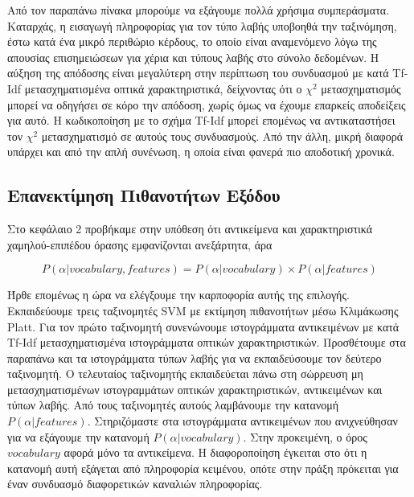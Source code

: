 \documentclass[11pt,a4paper,english,greek,twoside]{../Thesis}
\begin{document}
\par Από τον παραπάνω πίνακα μπορούμε να εξάγουμε πολλά χρήσιμα συμπεράσματα. Καταρχάς, η εισαγωγή πληροφορίας για τον τύπο λαβής υποβοηθά την ταξινόμηση, έστω κατά ένα μικρό περιθώριο κέρδους, το οποίο είναι αναμενόμενο λόγω της απουσίας επισημειώσεων για χέρια και τύπους λαβής στο σύνολο δεδομένων. Η αύξηση της απόδοσης είναι μεγαλύτερη στην περίπτωση του συνδυασμού με κατά Tf-Idf μετασχηματισμένα οπτικά χαρακτηριστικά, δείχνοντας ότι ο $\chi^2$ μετασχηματισμός μπορεί να οδηγήσει σε κόρο την απόδοση, χωρίς όμως να έχουμε επαρκείς αποδείξεις για αυτό. Η κωδικοποίηση με το σχήμα Tf-Idf μπορεί επομένως να αντικαταστήσει τον $\chi^2$ μετασχηματισμό σε αυτούς τους συνδυασμούς. Από την άλλη, μικρή διαφορά υπάρχει και από την απλή συνένωση, η οποία είναι φανερά πιο αποδοτική χρονικά.


\subsection{Επανεκτίμηση Πιθανοτήτων Εξόδου}
Στο κεφάλαιο 2 προβήκαμε στην υπόθεση ότι αντικείμενα και χαρακτηριστικά χαμηλού-επιπέδου όρασης εμφανίζονται ανεξάρτητα, άρα

\begin{equation}\label{eq:c6Probs}
    P(\alpha | vocabulary, features)=P(\alpha|vocabulary) \times P(\alpha|features)
\end{equation}

Ήρθε επομένως η ώρα να ελέγξουμε την καρποφορία αυτής της επιλογής. Εκπαιδεύουμε τρεις ταξινομητές SVM με εκτίμηση πιθανοτήτων μέσω Κλιμάκωσης Platt. Για τον πρώτο ταξινομητή συνενώνουμε ιστογράμματα αντικειμένων με κατά Tf-Idf μετασχηματισμένα ιστογράμματα οπτικών χαρακτηριστικών. Προσθέτουμε στα παραπάνω και τα ιστογράμματα τύπων λαβής για να εκπαιδεύσουμε τον δεύτερο ταξινομητή. Ο τελευταίος ταξινομητής εκπαιδεύεται πάνω στη σώρρευση μη μετασχηματισμένων ιστογραμμάτων οπτικών χαρακτηριστικών, αντικειμένων και τύπων λαβής. Από τους ταξινομητές αυτούς λαμβάνουμε την κατανομή $P(\alpha|features)$. Στηριζόμαστε στα ιστογράμματα αντικειμένων που ανιχνεύθησαν για να εξάγουμε την κατανομή $P(\alpha|vocabulary)$. Στην προκειμένη, ο όρος $vocabulary$ αφορά μόνο τα αντικείμενα. Η διαφοροποίηση έγκειται στο ότι η κατανομή αυτή εξάγεται από πληροφορία κειμένου, οπότε στην πράξη πρόκειται για έναν συνδυασμό διαφορετικών καναλιών πληροφορίας.
\end{document}
